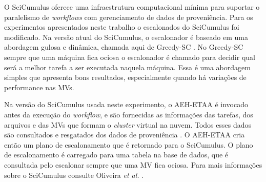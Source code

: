 O SciCumulus oferece uma infraestrutura computacional mínima para suportar o paralelismo de \textit{workflows} com gerenciamento de dados de proveniência. Para os experimentos apresentados neste trabalho o escalonados do SciCumulus foi modificado. Na versão atual do SciCumulus, o escalonador é baseado em uma abordagem gulosa e dinâmica, chamada  aqui de Greedy-SC \cite{Oliveira2012}. No Greedy-SC sempre que uma máquina fica ociosa o escalonador é chamado para decidir qual será a melhor tarefa a ser executada naquela máquina. Essa é uma abordagem simples que apresenta bons resultados, especialmente quando há variações de performance nas MVs.


Na versão do SciCumulus usada neste experimento, o AEH-ETAA é invocado antes da execução do \textit{workflow}, e são fornecidas as informações das tarefas, dos arquivos e das MVs que formam o \textit{cluster} virtual na nuvem. Todos esses dados são consultados e resgatados dos dados de proveniência \cite{freire2008}. O AEH-ETAA cria então um plano de escalonamento que é retornado para o SciCumulus. O plano de escalonamento é carregado para uma tabela na base de dados, que é consultada pelo escalonar sempre que uma MV fica ociosa. Para mais informações sobre o SciCumulus consulte Oliveira \textit{et al.} \cite{oliveira2010}. 


